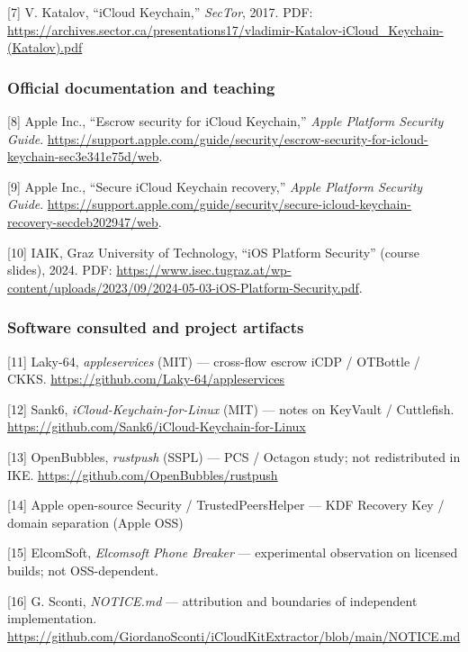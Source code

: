 \documentclass[
  english,
  10pt]{article}
\begin{document}
{[}7{]} V. Katalov, ``iCloud Keychain,'' \emph{SecTor}, 2017. PDF:
\url{https://archives.sector.ca/presentations17/vladimir-Katalov-iCloud_Keychain-(Katalov).pdf}

\subsubsection{Official documentation and
teaching}\label{official-documentation-and-teaching}

{[}8{]} Apple Inc., ``Escrow security for iCloud Keychain,'' \emph{Apple
Platform Security Guide}.
\url{https://support.apple.com/guide/security/escrow-security-for-icloud-keychain-sec3e341e75d/web}.

{[}9{]} Apple Inc., ``Secure iCloud Keychain recovery,'' \emph{Apple
Platform Security Guide}.
\url{https://support.apple.com/guide/security/secure-icloud-keychain-recovery-secdeb202947/web}.

{[}10{]} IAIK, Graz University of Technology, ``iOS Platform Security''
(course slides), 2024. PDF:
\url{https://www.isec.tugraz.at/wp-content/uploads/2023/09/2024-05-03-iOS-Platform-Security.pdf}.

\subsubsection{Software consulted and project
artifacts}\label{software-consulted-and-project-artifacts}

{[}11{]} Laky-64, \emph{appleservices} (MIT) --- cross-flow escrow iCDP
/ OTBottle / CKKS. \url{https://github.com/Laky-64/appleservices}

{[}12{]} Sank6, \emph{iCloud-Keychain-for-Linux} (MIT) --- notes on
KeyVault / Cuttlefish.
\url{https://github.com/Sank6/iCloud-Keychain-for-Linux}

{[}13{]} OpenBubbles, \emph{rustpush} (SSPL) --- PCS / Octagon study;
not redistributed in IKE. \url{https://github.com/OpenBubbles/rustpush}

{[}14{]} Apple open-source Security / TrustedPeersHelper --- KDF
Recovery Key / domain separation (Apple OSS)

{[}15{]} ElcomSoft, \emph{Elcomsoft Phone Breaker} --- experimental
observation on licensed builds; not OSS-dependent.

{[}16{]} G. Sconti, \emph{NOTICE.md} --- attribution and boundaries of
independent implementation.
\url{https://github.com/GiordanoSconti/iCloudKitExtractor/blob/main/NOTICE.md}
\end{document}

